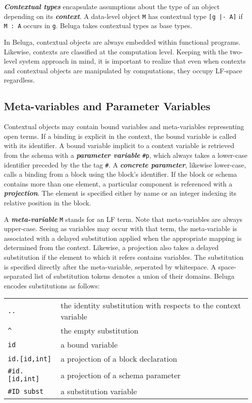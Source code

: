 \documentclass[11pt]{article}
\begin{document}
\textit{\textbf{Contextual types}} encapsulate assumptions about the type of an object depending on its \textit{\textbf{context}}.
A data-level object \verb+M+ has contextual type \verb+[g |- A]+ if \verb+M : A+ occurs in \verb+g+.
 Beluga takes contextual types as base types.

In Beluga, contextual objects are always embedded within functional programs.
Likewise, contexts are classified at the computation level.
Keeping with the two-level system approach in mind, it is important to realize that even when contexts and contextual objects are manipulated by computations, they occupy LF-space regardless.

\subsection{Meta-variables and Parameter Variables}
Contextual objects may contain bound variables and meta-variables representing open terms.
If a binding is explicit in the context, the bound variable is called with its identifier.
A bound variable implicit to a context variable is retrieved from the schema with a \textit{\textbf{parameter variable}} \verb+#p+, which always takes a lower-case identifier preceded by the the tag \verb+#+.
A \textit{\textbf{concrete parameter}}, likewise lower-case, calls a binding from a block using the block's identifier.
If the block or schema contains more than one element, a particular component is referenced with a \textbf{\textit{projection}}.
The element is specified either by name or an integer indexing its relative position in the block.

A \textit{\textbf{meta-variable}} \verb+M+ stands for an LF term.
Note that meta-variables are always upper-case.
Seeing as variables may occur with that term, the meta-variable is associated with a delayed substitution applied when the appropriate mapping is determined from the context.
Likewise, a projection also takes a delayed substitution if the element to which it refers contains variables.
The substitution is specified directly after the meta-variable, seperated by whitespace.
A space-separated list of substitution tokens denotes a union of their domains.
Beluga encodes substitutions as follows: \\

\begin{tabular}{ | l l}
\verb+..+ & the identity substitution with respects to the context variable\\
\verb+^+ & the empty substitution\\
\verb+id+ & a bound variable\\
\verb+id.[id,int]+ & a projection of a block declaration\\
\verb+#id.[id,int]+ & a projection of a schema parameter\\
\verb+#ID subst+ & a substitution variable\\
\end{tabular}\\
\\
\end{document}
